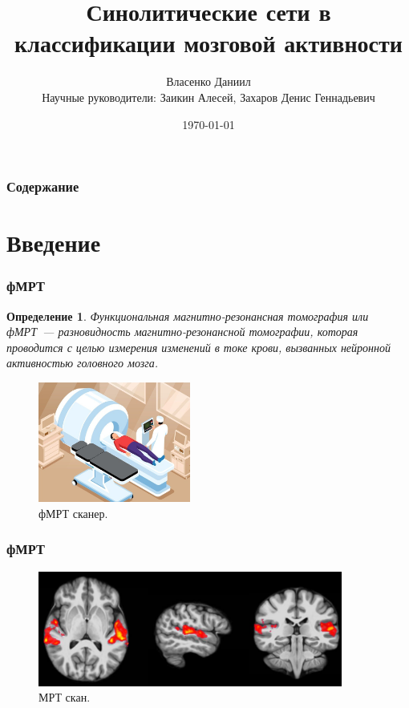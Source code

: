 \documentclass{beamer}
\newtheorem{definition_}{Определение}
\begin{document}
	\title{Синолитические сети в классификации мозговой активности}  
	\author{Власенко Даниил\\
	{\footnotesize Научные руководители: Заикин Алесей, Захаров Денис Геннадьевич}
	}
	\date{\today} 
	
	\begin{frame}
		\titlepage
	\end{frame}

	\begin{frame}
		\frametitle{Содержание}
		\tableofcontents
	\end{frame} 

	\section{Введение} 
	\begin{frame}
		\frametitle{фМРТ} 
							
		\begin{definition_}
			Функциональная магнитно-резонансная томография или фМРТ~--- разновидность магнитно-резонансной томографии, которая проводится с целью измерения изменений в токе крови, вызванных нейронной активностью головного мозга. 
		\end{definition_}
	
		\begin{figure}
			\includegraphics[width=5cm]{../images/fmri_1.jpeg}
			\caption{фМРТ сканер.} 
			\label{fg:1}
		\end{figure}		
	\end{frame}

	\begin{frame} 
		\frametitle{фМРТ}
		\begin{figure}
			\includegraphics[width=10cm]{../images/fmri_2.png}
			\caption{МРТ скан.} 
			\label{fg:2}
		\end{figure}
	\end{frame}
\end{document}
